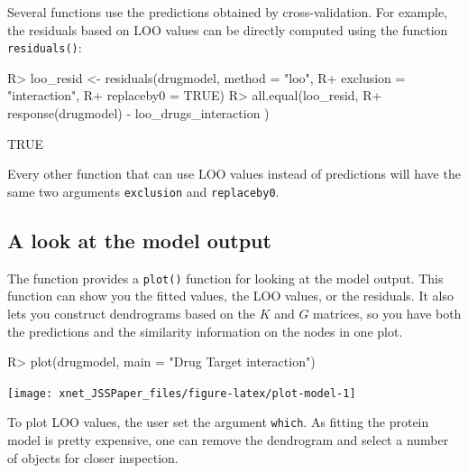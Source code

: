 \documentclass[
]{article}
\begin{document}
Several functions use the predictions obtained by cross-validation. For
example, the residuals based on LOO values can be directly computed
using the function \texttt{residuals()}:

\begin{CodeChunk}

\begin{CodeInput}
R> loo_resid <- residuals(drugmodel, method = "loo",
R+                        exclusion = "interaction",
R+                        replaceby0 = TRUE)
R> all.equal(loo_resid,
R+           response(drugmodel) - loo_drugs_interaction )
\end{CodeInput}

\begin{CodeOutput}
[1] TRUE
\end{CodeOutput}
\end{CodeChunk}

Every other function that can use LOO values instead of predictions will
have the same two arguments \texttt{exclusion} and \texttt{replaceby0}.

\hypertarget{a-look-at-the-model-output}{%
\subsection{A look at the model
output}\label{a-look-at-the-model-output}}

The function provides a \texttt{plot()} function for looking at the
model output. This function can show you the fitted values, the LOO
values, or the residuals. It also lets you construct dendrograms based
on the \(K\) and \(G\) matrices, so you have both the predictions and
the similarity information on the nodes in one plot.

\begin{CodeChunk}

\begin{CodeInput}
R> plot(drugmodel, main = "Drug Target interaction")
\end{CodeInput}


\begin{center}\texttt{[image: xnet\_JSSPaper\_files/figure-latex/plot-model-1]} \end{center}

\end{CodeChunk}

To plot LOO values, the user set the argument \texttt{which}. As fitting
the protein model is pretty expensive, one can remove the dendrogram and
select a number of objects for closer inspection.
\end{document}
